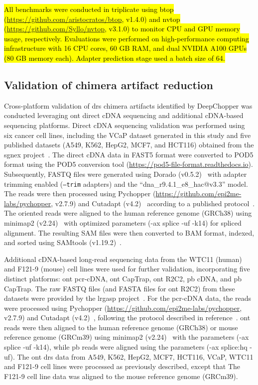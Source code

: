 \documentclass[pdflatex,sn-nature, lineno]{sn-jnl}%
\begin{document}
\hl{All benchmarks were conducted in triplicate using btop (\mbox{\url{https://github.com/aristocratos/btop}}, v1.4.0) and nvtop (\mbox{\url{https://github.com/Syllo/nvtop}}, v3.1.0) to monitor CPU and GPU memory usage, respectively. Evaluations were performed on high-performance computing infrastructure with 16 CPU cores, 60 GB RAM, and dual NVIDIA A100 GPUs (80 GB memory each). Adapter prediction stage used a batch size of 64.}


\subsection{Validation of chimera artifact reduction}

Cross-platform validation of \gls{drs} chimera artifacts identified by DeepChopper was conducted leveraging \gls{ont} direct cDNA sequencing and additional cDNA-based sequencing platforms.
Direct cDNA sequencing validation was performed using six cancer cell lines, including the VCaP dataset generated in this study and five published datasets (A549, K562, HepG2, MCF7, and HCT116) obtained from the \gls{sgnex} project~\cite{chen2021systematic}.
The direct cDNA data in FAST5 format were converted to POD5 format using the POD5 conversion tool (\url{https://pod5-file-format.readthedocs.io}).
Subsequently, FASTQ files were generated using Dorado (v0.5.2)~\cite{dorado2023} with adapter trimming enabled (\texttt{--trim} adapters) and the ``dna\_r9.4.1\_e8\_hac@v3.3'' model.
The reads were then processed using Pychopper (\url{https://github.com/epi2me-labs/pychopper}, v2.7.9) and Cutadapt (v4.2)~\cite{martin2011cutadapt} according to a published protocol~\cite{grunberger2022nanopore}.
The oriented reads were aligned to the human reference genome (GRCh38) using minimap2 (v2.24)~\cite{li2018minimap2} with optimized parameters (-ax splice -uf -k14) for spliced alignment.
The resulting SAM files were then converted to BAM format, indexed, and sorted using SAMtools (v1.19.2)~\cite{li2009sequence}.

Additional cDNA-based long-read sequencing data from the WTC11 (human) and F121-9 (mouse) cell lines were used for further validation, incorporating five distinct platforms: \gls{ont} \gls{pcr}-cDNA, \gls{ont} CapTrap, \gls{ont} R2C2, \gls{pb} cDNA, and \gls{pb} CapTrap.
The raw FASTQ files (and FASTA files for \gls{ont} R2C2) from these datasets were provided by the \gls{lrgasp} project~\cite{pardo2024systematic}.
For the \gls{pcr}-cDNA data, the reads were processed using Pychopper (\url{https://github.com/epi2me-labs/pychopper}, v2.7.9) and Cutadapt (v4.2)~\cite{martin2011cutadapt}, following the protocol described in reference~\cite{grunberger2022nanopore}. \gls{ont} reads were then aligned to the human reference genome (GRCh38) or mouse reference genome (GRCm39) using minimap2 (v2.24)~\cite{li2018minimap2} with the parameters (-ax splice -uf -k14), while \gls{pb} reads were aligned using the parameters (-ax splice:hq -uf).
The \gls{ont} \gls{drs} data from A549, K562, HepG2, MCF7, HCT116, VCaP, WTC11 and F121-9 cell lines were processed as previously described, except that The F121-9 cell line data was aligned to the mouse reference genome (GRCm39).
\end{document}
